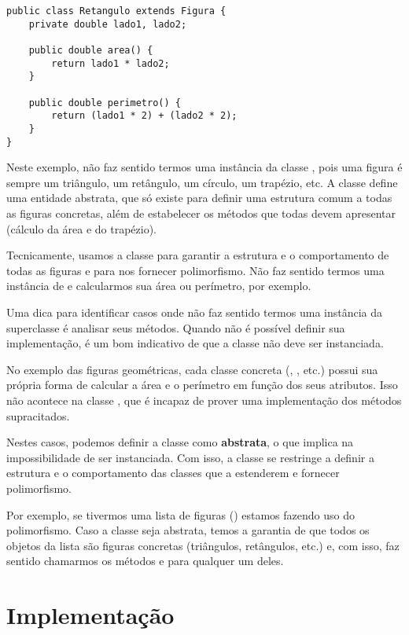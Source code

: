 \begin{verbatim}
public class Retangulo extends Figura {
	private double lado1, lado2;
	
	public double area() {
		return lado1 * lado2;
	}

	public double perimetro() {
		return (lado1 * 2) + (lado2 * 2);
	}
}
\end{verbatim}

Neste exemplo, não faz sentido termos uma instância da classe , pois uma figura é sempre um triângulo, um retângulo, um círculo, um trapézio, etc. A classe  define uma entidade abstrata, que só existe para definir uma estrutura comum a todas as figuras concretas, além de estabelecer os métodos que todas devem apresentar (cálculo da área e do trapézio).

Tecnicamente, usamos a classe  para garantir a estrutura e o comportamento de todas as figuras e para nos fornecer polimorfismo. Não faz sentido termos uma instância de  e calcularmos sua área ou perímetro, por exemplo.

Uma dica para identificar casos onde não faz sentido termos uma instância da superclasse é analisar seus métodos. Quando não é possível definir sua implementação, é um bom indicativo de que a classe não deve ser instanciada.

No exemplo das figuras geométricas, cada classe concreta (, , etc.) possui sua própria forma de calcular a área e o perímetro em função dos seus atributos. Isso não acontece na classe , que é incapaz de prover uma implementação dos métodos supracitados.

Nestes casos, podemos definir a classe como \textbf{abstrata}, o que implica na impossibilidade de ser instanciada. Com isso, a classe se restringe a definir a estrutura e o comportamento das classes que a estenderem e fornecer polimorfismo.

Por exemplo, se tivermos uma lista de figuras () estamos fazendo uso do polimorfismo. Caso a classe  seja abstrata, temos a garantia de que todos os objetos da lista são figuras concretas (triângulos, retângulos, etc.) e, com isso, faz sentido chamarmos os métodos  e  para qualquer um deles.

\section{Implementação}

